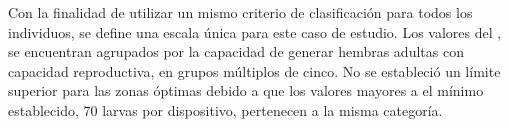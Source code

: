 Con la finalidad de utilizar un mismo criterio de clasificación para todos los individuos, se
define una escala única para este caso de estudio. Los valores del
, se encuentran agrupados por la capacidad de generar hembras
adultas con capacidad reproductiva, en grupos múltiplos de cinco. No se estableció un límite
superior para las zonas óptimas debido a que los valores mayores a el mínimo establecido, 70
larvas por dispositivo, pertenecen a la misma categoría.
